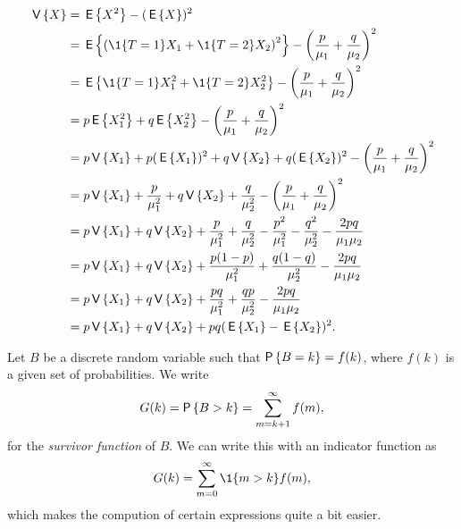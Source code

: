 \begin{exercise}
\begin{solution}
\begin{equation*}
  \begin{split}
  \V X 
&= \E{X^2} - (\E X)^2 \\
&= \E{\left(\1{T=1} X_1 + \1{T=2} X_2\right)^2} - \left(\frac{p}{\mu_1}+\frac{q}{\mu_2}\right)^2 \\
&= \E{\1{T=1} X_1^2 + \1{T=2} X_2^2} - \left(\frac{p}{\mu_1}+\frac{q}{\mu_2}\right)^2 \\ 
&= p \E{X_1^2} + q \E{X_2^2} - \left(\frac{p}{\mu_1}+\frac{q}{\mu_2}\right)^2 \\ 
&= p \V{X_1} + p (\E{X_1})^2 + q \V{X_2} + q(\E{ X_2})^2 - \left(\frac{p}{\mu_1}+\frac{q}{\mu_2}\right)^2 \\ 
&= p \V{X_1} + \frac{p}{\mu_1^2} + q \V{X_2} + \frac{q}{\mu_2^2} - \left(\frac{p}{\mu_1}+\frac{q}{\mu_2}\right)^2 \\ 
&= p \V{X_1} + q \V{X_2}
+ \frac{p}{\mu_1^2} + \frac{q}{\mu_2^2}
- \frac{p^2}{\mu_1^2}-\frac{q^2}{\mu_2^2}  -\frac{2pq}{\mu_1\mu_2}\\ 
&= p \V{X_1} + q \V{X_2}
+ \frac{p(1-p)}{\mu_1^2} + \frac{q(1-q)}{\mu_2^2}
-\frac{2pq}{\mu_1\mu_2}\\ 
&= p \V{X_1} + q \V{X_2}
+ \frac{pq}{\mu_1^2} + \frac{qp}{\mu_2^2}
-\frac{2pq}{\mu_1\mu_2}\\ 
&= p \V{X_1} + q \V{X_2}
+ pq(\E{X_1} - \E{X_2})^2.
\end{split}
\end{equation*}
\end{solution}
\end{exercise}


Let $B$ be a discrete random variable  such that $\P{B = k} = f(k)$, where $f(k)$ is a given set of
probabilities. We write
\begin{equation*}
  G(k) = \P{B>k} = \sum_{m=k+1}^\infty f(m),
\end{equation*}
for the \emph{survivor function} of $B$.  We can write this with an indicator function as
\begin{equation*}
  G(k) = \sum_{m=0}^\infty \1{m>k} f(m),
\end{equation*}
which makes the compution of certain expressions quite a bit easier. 

